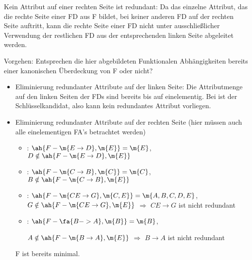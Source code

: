 \documentclass{bschlangaul-aufgabe}
\begin{document}
\begin{enumerate}
\begin{bAntwort}
\begin{enumerate}
Kein Attribut auf einer rechten Seite ist redundant: Da das einzelne
Attribut, das die rechte Seite einer FD aus F bildet, bei keiner anderen
FD auf der rechten Seite auftritt, kann die rechte Seite einer FD nicht
unter ausschließlicher Verwendung der restlichen FD aus der
entsprechenden linken Seite abgeleitet werden.
\end{enumerate}

\end{bAntwort}

\begin{bAntwort}
Vorgehen: Entsprechen die hier abgebildeten Funktionalen Abhängigkeiten
bereits einer kanonischen Überdeckung von F oder nicht?

\begin{itemize}
\item Eliminierung redundanter Attribute auf der linken Seite: Die
Attributmenge auf den linken Seiten der FDs sind bereits bis auf
 einelementig. Bei  ist  der
Schlüsselkandidat, also kann kein redundantes Attribut vorliegen.

\item Eliminierung redundanter Attribute auf der rechten Seite (hier
müssen auch alle einelementigen FA’s betrachtet werden)

\begin{itemize}
\item {}: $\ah{F - \m{E \rightarrow D}, \m{E}} = \m{E}$, \dh
$D \notin \ah{F - \m{E \rightarrow D}, \m{E}}$

\item {}: $\ah{F - \m{C \rightarrow B}, \m{C}} = \m{C}$, \dh
$B \notin \ah{F - \m{C \rightarrow B}, \m{E}}$

\item {}: $\ah{F - \m{CE \rightarrow G}, \m{C, E}} = \m{A, B, C, D, E}$, \dh
$G \notin \ah{F - \m{CE \rightarrow G}, \m{E}}$
$\Rightarrow$ $CE \rightarrow G$ ist nicht redundant

\item {}: $\ah{F - \fa{B -> A}, \m{B}} = \m{B}$, \dh

$A \notin \ah{F - \m{B \rightarrow A}, \m{E}}$
$\Rightarrow$ $B \rightarrow A$ ist nicht redundant
\end{itemize}

F ist bereits minimal.
\end{itemize}
\end{bAntwort}
\end{enumerate}
\end{document}
